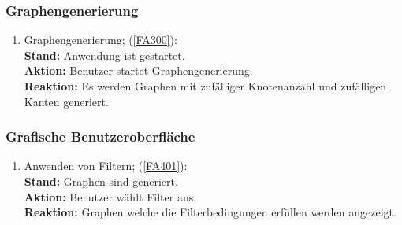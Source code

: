 \documentclass[13pt]{scrreprt}
\begin{document}
\subsubsection{Graphengenerierung}
\begin{addmargin}[25pt]{0pt}
	\begin{enumerate} [label=T\arabic*,start=300]
		\item Graphengenerierung; (\ref{FA300}):
		\\
		\textbf{Stand:} Anwendung ist gestartet.
		\\
		\textbf{Aktion:} Benutzer startet Graphengenerierung.
		\\
		\textbf{Reaktion:} Es werden Graphen mit zufälliger Knotenanzahl und zufälligen Kanten generiert.
	\end{enumerate}
\end{addmargin}

\subsubsection{Grafische Benutzeroberfläche}
\begin{addmargin}[25pt]{0pt}
	\begin{enumerate} [label=T\arabic*,start=400]
		\item Anwenden von \Gls{Filter}n; (\ref{FA401}):
		\\
		\textbf{Stand:} Graphen sind generiert.
		\\
		\textbf{Aktion:} Benutzer wählt \Gls{Filter} aus.
		\\
		\textbf{Reaktion:} Graphen welche die Filterbedingungen erfüllen werden angezeigt.
	\end{enumerate}
\end{addmargin}
\end{document}
